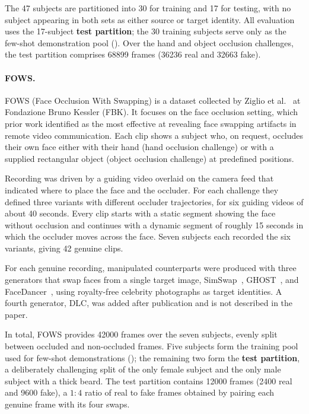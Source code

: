 The 47 subjects are partitioned into 30 for training and 17 for testing, with no subject appearing in both sets as either source or target identity. All evaluation uses the 17-subject \textbf{test partition}; the 30 training subjects serve only as the few-shot demonstration pool (). Over the hand and object occlusion challenges, the test partition comprises \num{68899} frames (\num{36236} real and \num{32663} fake).

\paragraph{FOWS.}
FOWS (Face Occlusion With Swapping) is a dataset collected by Ziglio et al.~\cite{fows} at Fondazione Bruno Kessler (FBK). It focuses on the face occlusion setting, which prior work identified as the most effective at revealing face swapping artifacts in remote video communication. Each clip shows a subject who, on request, occludes their own face either with their hand (hand occlusion challenge) or with a supplied rectangular object (object occlusion challenge) at predefined positions.

Recording was driven by a guiding video overlaid on the camera feed that indicated where to place the face and the occluder. For each challenge they defined three variants with different occluder trajectories, for six guiding videos of about 40 seconds. Every clip starts with a static segment showing the face without occlusion and continues with a dynamic segment of roughly 15 seconds in which the occluder moves across the face. Seven subjects each recorded the six variants, giving 42 genuine clips.

For each genuine recording, manipulated counterparts were produced with three generators that swap faces from a single target image, SimSwap~\cite{simswap}, GHOST~\cite{ghost}, and FaceDancer~\cite{facedancer}, using royalty-free celebrity photographs as target identities. A fourth generator, DLC, was added after publication and is not described in the paper.

In total, FOWS provides \num{42000} frames over the seven subjects, evenly split between occluded and non-occluded frames. Five subjects form the training pool used for few-shot demonstrations (); the remaining two form the \textbf{test partition}, a deliberately challenging split of the only female subject and the only male subject with a thick beard. The test partition contains \num{12000} frames (\num{2400} real and \num{9600} fake), a $1:4$ ratio of real to fake frames obtained by pairing each genuine frame with its four swaps.

